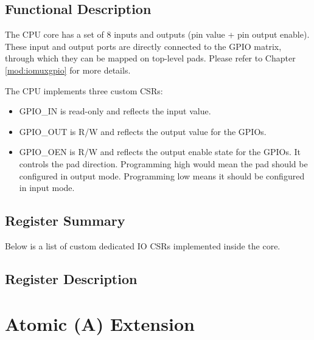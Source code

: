 \documentclass[main\_\_EN.tex]{subfiles}
\begin{document}
\subsection{Functional Description}
\label{sec:riscvcpu-fastio-func-descr}

The CPU core has a set of 8 inputs and outputs (pin value + pin output enable). These input and output ports are directly connected to the GPIO matrix, through which they can be mapped on top-level pads. Please refer to Chapter \ref{mod:iomuxgpio} \textit{} for more details.

The CPU implements three custom CSRs:
\begin{itemize}
    \item GPIO\_IN is read-only and reflects the input value.
    \item GPIO\_OUT is R/W and reflects the output value for the GPIOs.
    \item GPIO\_OEN is R/W and reflects the output enable state for the GPIOs. It controls the pad direction. Programming high would mean the pad should be configured in output mode. Programming low means it should be configured in input mode.
\end{itemize}


\clearpage
\hypertarget{riscvcpu-fastio-reg-summ}{}
\subsection{Register Summary}
\label{sec:riscvcpu-fastio-reg-summ}


Below is a list of custom dedicated IO CSRs implemented inside the core.




\subsection{Register Description}
\label{sec:riscvcpu-fastio-reg-desc}



\clearpage
\section{Atomic (A) Extension}
\label{sec:riscvcpu-atomic}
\end{document}
